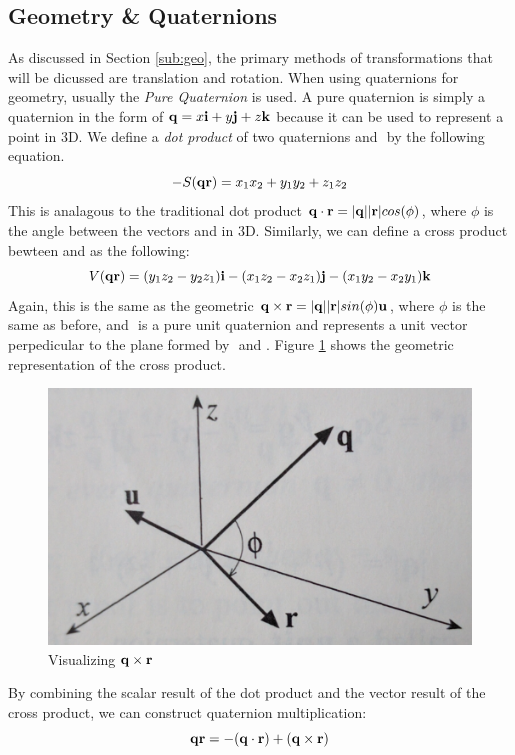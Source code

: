 \subsection{Geometry \& Quaternions}
As discussed in Section \ref{sub:geo}, the primary methods of transformations that will be dicussed are translation and rotation.
When using quaternions for geometry, usually the \textit{Pure Quaternion} is used.
A pure quaternion is simply a quaternion in the form of $\text{\textbf{q}} = x\text{\textbf{i}} + y\text{\textbf{j}} + z\text{\textbf{k}}$ because it can be used to represent a point in 3D.
We define a \textit{dot product} of two quaternions \qq and \qr$ $ by the following equation.
\begin{equation}
-S(\text{\textbf{q}}\text{\textbf{r}}) = x_1x_2 + y_1y_2 + z_1z_2
\end{equation}
This is analagous to the traditional dot product $\text{\textbf{q}} \cdot \text{\textbf{r}} = \lvert\text{\textbf{q}}\rvert\lvert\text{\textbf{r}}\rvert cos(\phi)$, where $\phi$ is the angle between the vectors \qq and \qr in 3D.
Similarly, we can define a cross product bewteen \qq and \qr as the following:
\begin{equation}
V(\text{\textbf{q}}\text{\textbf{r}}) = (y_1z_2 - y_2z_1)\text{\textbf{i}} - (x_1z_2 - x_2z_1)\text{\textbf{j}} -(x_1y_2-x_2y_1)\text{\textbf{k}}
\end{equation}
Again, this is the same as the geometric $\text{\textbf{q}} \times \text{\textbf{r}} = \lvert\text{\textbf{q}}\rvert\lvert\text{\textbf{r}}\rvert sin(\phi)\text{\textbf{u}}$, where $\phi$ is the same as before, and \qu$ $ is a pure unit quaternion and represents a unit vector perpedicular to the plane formed by \qq$ $ and \qr.
Figure \ref{fig:cross} shows the geometric representation of the cross product.

\begin{figure}[H]
\centering
\includegraphics[width = .65\textwidth]{Figures/cross_product}
\caption{Visualizing $\text{\textbf{q}} \times \text{\textbf{r}}$}
\label{fig:cross}
\end{figure}

By combining the scalar result of the dot product and the vector result of the cross product, we can construct quaternion multiplication:
\begin{equation}
\label{eq:mult}
\text{\textbf{q}}\text{\textbf{r}} = -(\text{\textbf{q}} \cdot \text{\textbf{r}}) + (\text{\textbf{q}} \times \text{\textbf{r}})
\end{equation}

